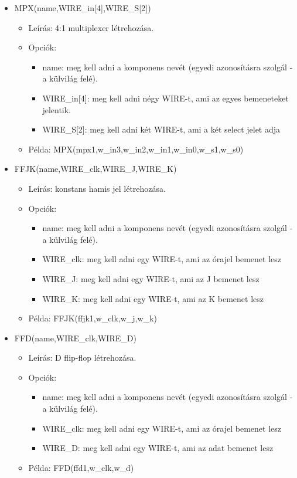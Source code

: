 \begin{itemize}
\item MPX(name,WIRE\_in[4],WIRE\_S[2])
	\begin{itemize}
	\item Leírás: 4:1 multiplexer létrehozása.
	\item Opciók: 
		\begin{itemize}
			\item name: meg kell adni a komponens nevét (egyedi azonosításra szolgál - a külvilág felé).
			\item WIRE\_in[4]: meg kell adni négy WIRE-t, ami az egyes bemeneteket jelentik.
			\item WIRE\_S[2]: meg kell adni két WIRE-t, ami a két select jelet adja
		\end{itemize}
	\item Példa: MPX(mpx1,w\_in3,w\_in2,w\_in1,w\_in0,w\_s1,w\_s0)
	\end{itemize}	
	
\item FFJK(name,WIRE\_clk,WIRE\_J,WIRE\_K)
	\begin{itemize}
	\item Leírás: konstans hamis jel létrehozása.
	\item Opciók: 
		\begin{itemize}
			\item name: meg kell adni a komponens nevét (egyedi azonosításra szolgál - a külvilág felé).
			\item WIRE\_clk: meg kell adni egy WIRE-t, ami az órajel bemenet lesz
			\item WIRE\_J: meg kell adni egy WIRE-t, ami az J bemenet lesz
			\item WIRE\_K: meg kell adni egy WIRE-t, ami az K bemenet lesz			
		\end{itemize}
	\item Példa: FFJK(ffjk1,w\_clk,w\_j,w\_k)
	\end{itemize}

\item FFD(name,WIRE\_clk,WIRE\_D)
	\begin{itemize}
	\item Leírás: D flip-flop létrehozása.
	\item Opciók: 
		\begin{itemize}
			\item name: meg kell adni a komponens nevét (egyedi azonosításra szolgál - a külvilág felé).
			\item WIRE\_clk: meg kell adni egy WIRE-t, ami az órajel bemenet lesz
			\item WIRE\_D: meg kell adni egy WIRE-t, ami az adat bemenet lesz
		\end{itemize}
	\item Példa: FFD(ffd1,w\_clk,w\_d)
	\end{itemize}
	

\end{itemize}
